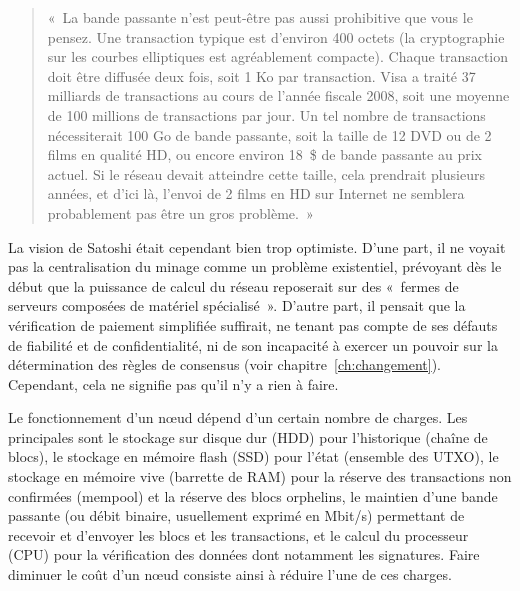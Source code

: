 \begin{quote}
«~La bande passante n'est peut-être pas aussi prohibitive que vous le pensez. Une transaction typique est d'environ 400 octets (la cryptographie sur les courbes elliptiques est agréablement compacte). Chaque transaction doit être diffusée deux fois, soit 1 Ko par transaction. Visa a traité 37 milliards de transactions au cours de l'année fiscale 2008, soit une moyenne de 100 millions de transactions par jour. Un tel nombre de transactions nécessiterait 100 Go de bande passante, soit la taille de 12 DVD ou de 2 films en qualité HD, ou encore environ 18~\$ de bande passante au prix actuel. Si le réseau devait atteindre cette taille, cela prendrait plusieurs années, et d'ici là, l'envoi de 2 films en HD sur Internet ne semblera probablement pas être un gros problème.~»
\end{quote} %

La vision de Satoshi était cependant bien trop optimiste. D'une part, il ne voyait pas la centralisation du minage comme un problème existentiel, prévoyant dès le début que la puissance de calcul du réseau reposerait sur des «~fermes de serveurs composées de matériel spécialisé~». D'autre part, il pensait que la vérification de paiement simplifiée suffirait, ne tenant pas compte de ses défauts de fiabilité et de confidentialité, ni de son incapacité à exercer un pouvoir sur la détermination des règles de consensus (voir chapitre~\ref{ch:changement}). Cependant, cela ne signifie pas qu'il n'y a rien à faire.

Le fonctionnement d'un nœud dépend d'un certain nombre de charges. Les principales sont le stockage sur disque dur (HDD) pour l'historique (chaîne de blocs), le stockage en mémoire flash (SSD) pour l'état (ensemble des UTXO), le stockage en mémoire vive (barrette de RAM) pour la réserve des transactions non confirmées (mempool) et la réserve des blocs orphelins, le maintien d'une bande passante (ou débit binaire, usuellement exprimé en Mbit/s) permettant de recevoir et d'envoyer les blocs et les transactions, et le calcul du processeur (CPU) pour la vérification des données dont notamment les signatures. Faire diminuer le coût d'un nœud consiste ainsi à réduire l'une de ces charges.


